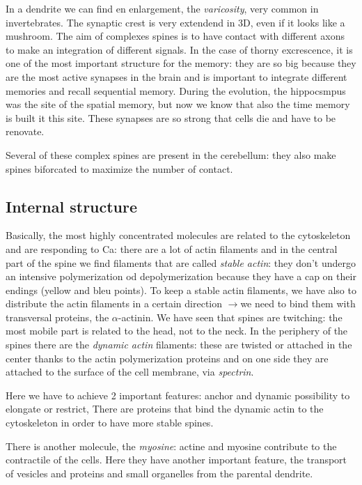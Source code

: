 \documentclass[a4paper, 12pt]{book}
\newcommand{\lfreccia}{\ensuremath{\longrightarrow}}
\begin{document}
In a dendrite we can find en enlargement, the \emph{varicosity}, very common in invertebrates. The synaptic crest is very extendend in 3D, even if it looks like a mushroom.
The aim of complexes spines is to have contact with different axons to make an integration of different signals. In the case of thorny excrescence, it is one of the most important structure for the memory: they are so big because they are the most active synapses in the brain and is important to integrate different memories and recall sequential memory.  During the evolution, the hippocsmpus was the site of the spatial memory, but now we know that also the time memory is built it this site. These synapses are so strong that cells die and have to be renovate. 

Several of these complex spines are present in the cerebellum: they also make spines biforcated to maximize the number of contact.

\subsection{Internal structure}
Basically, the most highly concentrated molecules are related to the cytoskeleton and are responding to Ca: there are a lot of actin filaments and in the central part of the spine we find filaments that are called \emph{stable actin}: they don't undergo an intensive polymerization od depolymerization because they have a cap on their endings (yellow and bleu points). To keep a stable actin filaments, we have also to distribute the actin filaments in a certain direction \lfreccia we need to bind them with transversal proteins, the $\alpha$-actinin. We have seen that spines are twitching: the most mobile part is related to the head, not to the neck. In the periphery of the spines there are the \emph{dynamic actin} filaments: these are twisted or attached in the center thanks to the actin polymerization proteins and on  one side they are attached to the surface of the cell membrane, via \emph{spectrin}.

Here we have to achieve 2 important features: anchor and dynamic possibility to elongate or restrict, There are proteins that bind the dynamic actin to the cytoskeleton in order to have more stable spines.

There is another molecule, the \emph{myosine}: actine and myosine contribute to the contractile of the cells. Here they have another important feature, the transport of vesicles and proteins and small organelles from the parental dendrite. 
\end{document}
